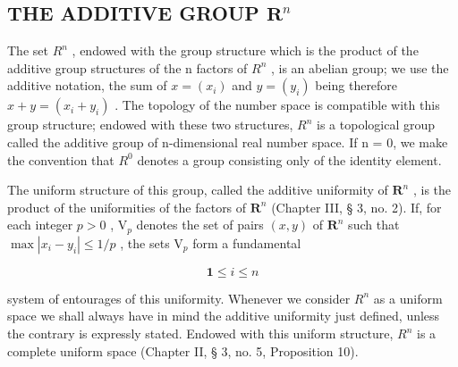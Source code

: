 \subsection{\texorpdfstring{THE ADDITIVE GROUP \(\mathbf{R}^n\)}{THE ADDITIVE GROUP R TO THE N}}

The set \(R^{n}\) , endowed with the group structure which is the product of the additive group structures of the n factors of \(R^{n}\) , is an abelian group; we use the additive notation, the sum of \(x = (x_{i})\) and \(y = (y_{i})\) being therefore \(x + y = (x_{i} + y_{i})\) . The topology of the number space is compatible with this group structure; endowed with these two structures, \(R^{n}\) is a topological group called the additive group of n-dimensional real number space. If n = 0, we make the convention that \(R^{0}\) denotes a group consisting only of the identity element.

The uniform structure of this group, called the additive uniformity of \(\mathbf{R}^n\) , is the product of the uniformities of the factors of \(\mathbf{R}^n\) (Chapter III, § 3, no. 2). If, for each integer \(p > 0\) , \(\mathrm{V}_p\) denotes the set of pairs \((x, y)\) of \(\mathbf{R}^n\) such that \(\max |x_i - y_i| \leqslant 1/p\) , the sets \(\mathrm{V}_p\) form a fundamental

\[
\mathbf {1} \leqslant i \leqslant n
\]

system of entourages of this uniformity. Whenever we consider \(R^{n}\) as a uniform space we shall always have in mind the additive uniformity just defined, unless the contrary is expressly stated. Endowed with this uniform structure, \(R^{n}\) is a complete uniform space (Chapter II, § 3, no. 5, Proposition 10).

